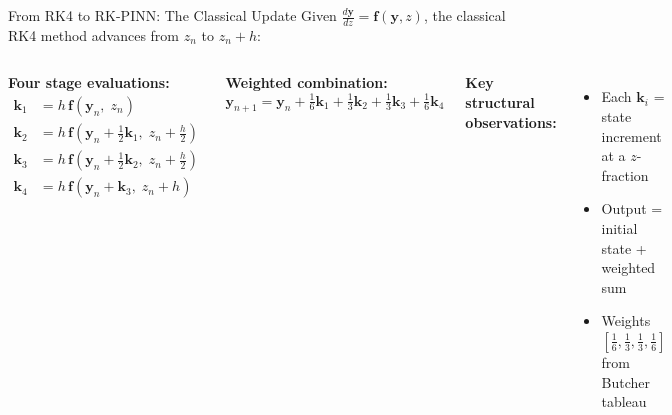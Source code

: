 \documentclass[aspectratio=169, 11pt]{beamer}
\newcommand{\vb}[1]{\bm{#1}}
\begin{document}
\begin{frame}{From RK4 to RK-PINN: The Classical Update}
  Given $\frac{d\vb{y}}{dz} = \vb{f}(\vb{y}, z)$, the classical RK4 method advances from $z_n$ to $z_n + h$:
  \begin{columns}[T]
    \textbf{Four stage evaluations:}
    \begin{align*}
      \vb{k}_1 &= h\,\vb{f}(\vb{y}_n,\; z_n) \\
      \vb{k}_2 &= h\,\vb{f}\!\left(\vb{y}_n + \tfrac{1}{2}\vb{k}_1,\; z_n + \tfrac{h}{2}\right) \\
      \vb{k}_3 &= h\,\vb{f}\!\left(\vb{y}_n + \tfrac{1}{2}\vb{k}_2,\; z_n + \tfrac{h}{2}\right) \\
      \vb{k}_4 &= h\,\vb{f}\!\left(\vb{y}_n + \vb{k}_3,\; z_n + h\right)
    \end{align*}

    \textbf{Weighted combination:}
    \[
      \vb{y}_{n+1} = \vb{y}_n + \tfrac{1}{6}\vb{k}_1 + \tfrac{1}{3}\vb{k}_2 + \tfrac{1}{3}\vb{k}_3 + \tfrac{1}{6}\vb{k}_4
    \]

    \textbf{Key structural observations:}
    \begin{itemize}
      \item Each $\vb{k}_i$ = state increment at a $z$-fraction
      \item Output = initial state + weighted sum
      \item Weights $[\tfrac{1}{6}, \tfrac{1}{3}, \tfrac{1}{3}, \tfrac{1}{6}]$ from Butcher tableau
    \end{itemize}
  \end{columns}

  \medskip
  \centering
\end{frame}
\end{document}
